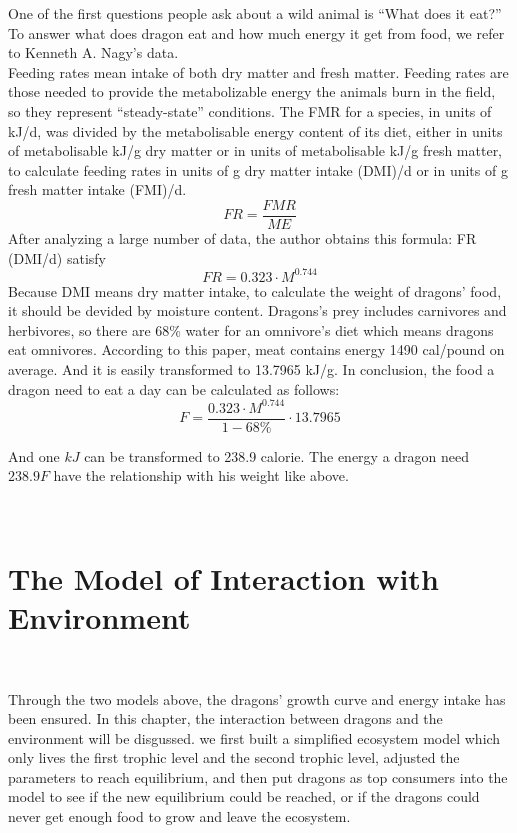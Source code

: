 \documentclass{mcmthesis}
\begin{document}
One of the first questions people ask about a wild animal is “What does it eat?” To answer what does dragon eat 
and how much energy it get from food, we refer to Kenneth A. Nagy's data.\\
Feeding rates mean intake of both dry matter and fresh matter. 
Feeding rates are those needed to provide the metabolizable energy the animals burn in the field, so they represent “steady-state” conditions.
The FMR for a species, in units of kJ/d, was divided by the metabolisable energy content of its diet, 
either in units of metabolisable kJ/g dry matter or in units of metabolisable kJ/g fresh matter, 
to calculate feeding rates in units of g dry matter intake (DMI)/d or in units of g fresh matter intake (FMI)/d.
\begin{equation}
FR = \frac{FMR}{ME}
\end{equation}
After analyzing a large number of data, the author obtains this formula: FR (DMI/d) satisfy
\begin{equation}
FR = 0.323 \cdot M^{0.744}
\end{equation}
Because DMI means dry matter intake, to calculate the weight of dragons' food, it should be devided by moisture content.
Dragons's prey includes carnivores and herbivores, so there are 68\% water for an omnivore’s diet which means dragons eat omnivores.
According to this paper, meat contains energy 1490 cal/pound on average. And it is easily transformed to 13.7965 kJ/g.
In conclusion, the food a dragon need to eat a day can be calculated as follows:
\begin{equation}
F = \frac{0.323 \cdot M^{0.744}}{1-68\%}\cdot13.7965
\end{equation}

And one $kJ$ can be transformed to 238.9 calorie. The energy a dragon need $238.9F$ have the relationship with his weight like above.


~\ \
\section{The Model of Interaction with Environment}
~\ \

Through the two models above, the dragons' growth curve and energy intake has been ensured. In this chapter,
the interaction between dragons and the environment will be disgussed. 
we first built a simplified ecosystem model which only lives the first trophic level and the second trophic level, 
adjusted the parameters to reach equilibrium, and then put dragons as top consumers into the model to see 
if the new equilibrium could be reached, or if the dragons could never get enough food to grow and leave the ecosystem.
\end{document}
